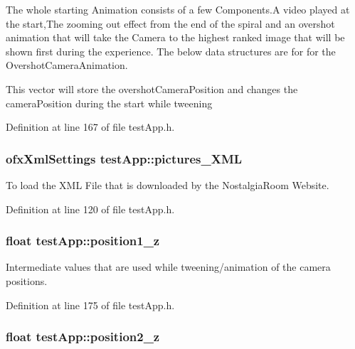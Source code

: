 The whole starting Animation consists of a few Components.\-A video played at the start,The zooming out effect from the end of the spiral and an overshot animation that will take the Camera to the highest ranked image that will be shown first during the experience. The below data structures are for for the Overshot\-Camera\-Animation. 

This vector will store the overshot\-Camera\-Position and changes the camera\-Position during the start while tweening 

Definition at line 167 of file test\-App.\-h.

\hypertarget{classtest_app_a85133f49103cfa002f39d882f7168236}{
\subsubsection[{pictures\-\_\-\-X\-M\-L}]{\setlength{\rightskip}{0pt plus 5cm}ofx\-Xml\-Settings test\-App\-::pictures\-\_\-\-X\-M\-L}}\label{classtest_app_a85133f49103cfa002f39d882f7168236}


To load the X\-M\-L File that is downloaded by the Nostalgia\-Room Website. 



Definition at line 120 of file test\-App.\-h.

\hypertarget{classtest_app_a808376783cdf510335cd1b37026e9bb3}{
\subsubsection[{position1\-\_\-z}]{\setlength{\rightskip}{0pt plus 5cm}float test\-App\-::position1\-\_\-z}}\label{classtest_app_a808376783cdf510335cd1b37026e9bb3}


Intermediate values that are used while tweening/animation of the camera positions. 



Definition at line 175 of file test\-App.\-h.

\hypertarget{classtest_app_a0720011cfaade6388109232ea4927c19}{
\subsubsection[{position2\-\_\-z}]{\setlength{\rightskip}{0pt plus 5cm}float test\-App\-::position2\-\_\-z}}\label{classtest_app_a0720011cfaade6388109232ea4927c19}


